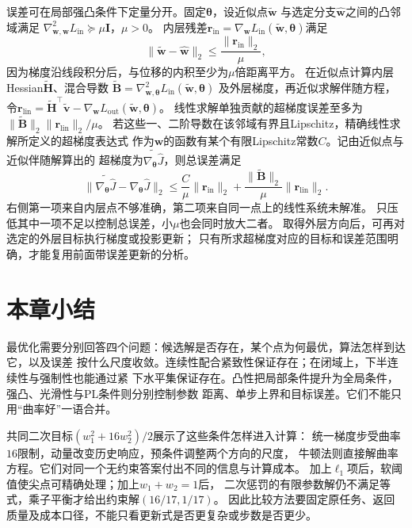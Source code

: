 误差可在局部强凸条件下定量分开。固定$\bm\theta$，设近似点$\widetilde{\bm w}$
与选定分支$\widehat{\bm w}$之间的凸邻域满足
$\nabla_{\bm w,\bm w}^2L_{\mathrm{in}}\succeq\mu\bm I$，$\mu>0$。
内层残差$\bm r_{\mathrm{in}}=\nabla_{\bm w}L_{\mathrm{in}}(\widetilde{\bm w},\bm\theta)$满足
\[
 \|\widetilde{\bm w}-\widehat{\bm w}\|_2
 \leq\frac{\|\bm r_{\mathrm{in}}\|_2}{\mu},
\]
因为梯度沿线段积分后，与位移的内积至少为$\mu$倍距离平方。
在近似点计算内层Hessian$\widetilde{\bm H}$、混合导数
$\widetilde{\bm B}=\nabla_{\bm w,\bm\theta}^2L_{\mathrm{in}}(\widetilde{\bm w},\bm\theta)$
及外层梯度，再近似求解伴随方程，
令$\bm r_{\mathrm{lin}}=\widetilde{\bm H}^{\top}\widetilde{\bm v}
-\nabla_{\bm w}L_{\mathrm{out}}(\widetilde{\bm w},\bm\theta)$。
线性求解单独贡献的超梯度误差至多为
$\|\widetilde{\bm B}\|_2\|\bm r_{\mathrm{lin}}\|_2/\mu$。
若这些一、二阶导数在该邻域有界且Lipschitz，精确线性求解所定义的超梯度表达式
作为$\bm w$的函数有某个有限Lipschitz常数$C$。记由近似点与近似伴随解算出的
超梯度为$\widetilde{\nabla_{\bm\theta}\widehat J}$，则总误差满足
\begin{equation}
 \|\widetilde{\nabla_{\bm\theta}\widehat J}-\nabla_{\bm\theta}\widehat J\|_2
 \leq\frac C\mu\|\bm r_{\mathrm{in}}\|_2
 +\frac{\|\widetilde{\bm B}\|_2}{\mu}\|\bm r_{\mathrm{lin}}\|_2.
 \label{eq:opt-hypergradient-two-residuals}
\end{equation}
右侧第一项来自内层点不够准确，第二项来自同一点上的线性系统未解准。
只压低其中一项不足以控制总误差，小$\mu$也会同时放大二者。
取得外层方向后，可再对选定的外层目标执行梯度或投影更新；
只有所求超梯度对应的目标和误差范围明确，才能复用前面带误差更新的分析。

\section{本章小结}
\label{sec:opt-summary}

最优化需要分别回答四个问题：候选解是否存在，某个点为何最优，算法怎样到达它，以及误差
按什么尺度收敛。连续性配合紧致性保证存在；在闭域上，下半连续性与强制性也能通过紧
下水平集保证存在。凸性把局部条件提升为全局条件，强凸、光滑性与PL条件则分别控制参数
距离、单步上界和目标误差。它们不能只用“曲率好”一语合并。

共同二次目标$(w_1^2+16w_2^2)/2$展示了这些条件怎样进入计算：
统一梯度步受曲率$16$限制，动量改变历史响应，预条件调整两个方向的尺度，
牛顿法则直接解曲率方程。它们对同一个无约束答案付出不同的信息与计算成本。
加上$\ell_1$项后，软阈值使尖点可精确处理；加上$w_1+w_2=1$后，
二次惩罚的有限参数解仍不满足等式，乘子平衡才给出约束解$(16/17,1/17)$。
因此比较方法要固定原任务、返回质量及成本口径，不能只看更新式是否更复杂或步数是否更少。

